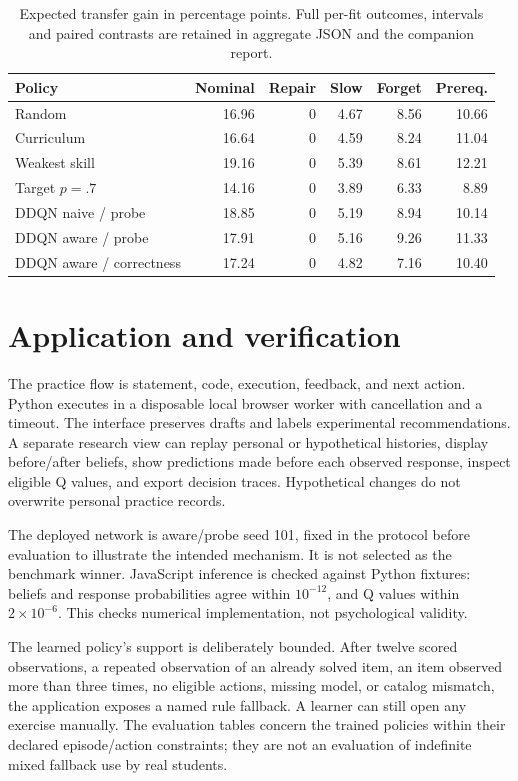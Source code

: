 \documentclass[11pt,a4paper]{article}
\begin{document}
\begin{table}[ht]\centering\small
\begin{tabular}{lrrrrr}\toprule
Policy & Nominal & Repair & Slow & Forget & Prereq.\\\midrule
Random & 16.96 & 0 & 4.67 & 8.56 & 10.66\\
Curriculum & 16.64 & 0 & 4.59 & 8.24 & 11.04\\
Weakest skill & 19.16 & 0 & 5.39 & 8.61 & 12.21\\
Target $p=.7$ & 14.16 & 0 & 3.89 & 6.33 & 8.89\\
DDQN naive / probe & 18.85 & 0 & 5.19 & 8.94 & 10.14\\
DDQN aware / probe & 17.91 & 0 & 5.16 & 9.26 & 11.33\\
DDQN aware / correctness & 17.24 & 0 & 4.82 & 7.16 & 10.40\\\bottomrule
\end{tabular}
\caption{Expected transfer gain in percentage points. Full per-fit outcomes, intervals and paired contrasts are retained in aggregate JSON and the companion report.}\label{tab:all}
\end{table}

\section{Application and verification}
The practice flow is statement, code, execution, feedback, and next action. Python executes in a disposable local browser worker with cancellation and a timeout. The interface preserves drafts and labels experimental recommendations. A separate research view can replay personal or hypothetical histories, display before/after beliefs, show predictions made before each observed response, inspect eligible Q values, and export decision traces. Hypothetical changes do not overwrite personal practice records.

The deployed network is aware/probe seed 101, fixed in the protocol before evaluation to illustrate the intended mechanism. It is not selected as the benchmark winner. JavaScript inference is checked against Python fixtures: beliefs and response probabilities agree within $10^{-12}$, and Q values within $2\times10^{-6}$. This checks numerical implementation, not psychological validity.

The learned policy's support is deliberately bounded. After twelve scored observations, a repeated observation of an already solved item, an item observed more than three times, no eligible actions, missing model, or catalog mismatch, the application exposes a named rule fallback. A learner can still open any exercise manually. The evaluation tables concern the trained policies within their declared episode/action constraints; they are not an evaluation of indefinite mixed fallback use by real students.
\end{document}
